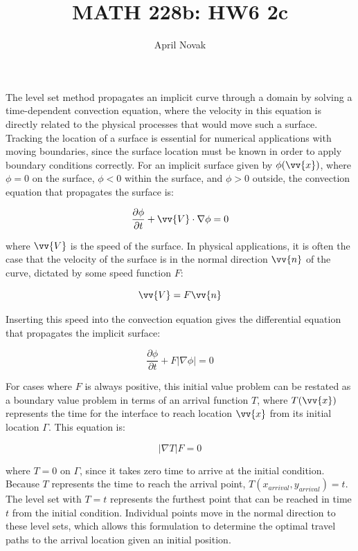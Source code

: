 \documentclass[10pt]{article}
\newcommand{\beq}{\begin{equation}}
\newcommand{\eeq}{\end{equation}}
\begin{document}
\title{MATH 228b: HW6 2c}
\author{April Novak}

\maketitle

\section{}
The level set method propagates an implicit curve through a domain by solving a time-dependent convection equation, where the velocity in this equation is directly related to the physical processes that would move such a surface. Tracking the location of a surface is essential for numerical applications with moving boundaries, since the surface location must be known in order to apply boundary conditions correctly. For an implicit surface given by \(\phi(\vv{x})\), where \(\phi=0\) on the surface, \(\phi<0\) within the surface, and \(\phi>0\) outside, the convection equation that propagates the surface is:

\beq
\frac{\partial\phi}{\partial t}+\vv{V}\cdot\nabla\phi=0
\eeq

where \(\vv{V}\) is the speed of the surface. In physical applications, it is often the case that the velocity of the surface is in the normal direction \(\vv{n}\) of the curve, dictated by some speed function \(F\):

\beq
\vv{V}=F\vv{n}
\eeq

Inserting this speed into the convection equation gives the differential equation that propagates the implicit surface:

\beq
\frac{\partial\phi}{\partial t}+F|\nabla\phi|=0
\eeq

For cases where \(F\) is always positive, this initial value problem can be restated as a boundary value problem in terms of an arrival function \(T\), where \(T(\vv{x})\) represents the time for the interface to reach location \(\vv{x}\) from its initial location \(\Gamma\). This equation is:

\beq
|\nabla T|F=0
\eeq

where \(T=0\) on \(\Gamma\), since it takes zero time to arrive at the initial condition. Because \(T\) represents the time to reach the arrival point, \(T(x_{arrival}, y_{arrival})=t\). The level set with \(T=t\) represents the furthest point that can be reached in time \(t\) from the initial condition. Individual points move in the normal direction to these level sets, which allows this formulation to determine the optimal travel paths to the arrival location given an initial position. 
\end{document}
